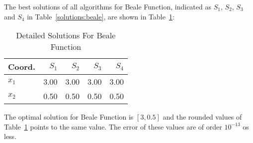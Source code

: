The best solutions of all algorithms for Beale Function, indicated as
$S_{1}$, $S_{2}$, $S_{3}$ and $S_{4}$ in Table~\ref{solutions:beale}, are shown
in Table~\ref{detailedsolutions:beale}:

\begin{table}[H]
\centering
\caption{Detailed Solutions For Beale Function}
\label{detailedsolutions:beale}
\begin{tabular}{lrrrr}
\toprule
 Coord. &  $S_{1}$ &  $S_{2}$ &  $S_{3}$ &  $S_{4}$ \\
\midrule
$x_{1}$ &     3.00 &     3.00 &     3.00 &     3.00 \\
$x_{2}$ &     0.50 &     0.50 &     0.50 &     0.50 \\
\bottomrule
\end{tabular}
\end{table}

The optimal solution for Beale Function is $[3, 0.5]$ and the rounded values
of Table~\ref{detailedsolutions:beale} points to the same value. The error of
these values are of order $10^{-13}$ os less.


